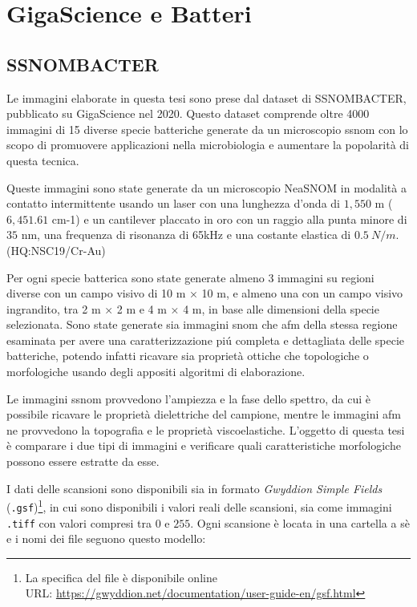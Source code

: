 \documentclass[../main.tex]{subfiles}
\begin{document}
\chapter{GigaScience e Batteri}

\section{SSNOMBACTER}

Le immagini elaborate in questa tesi sono prese dal dataset di SSNOMBACTER, pubblicato su GigaScience nel 2020. Questo dataset comprende oltre 4000 immagini di 15 diverse specie batteriche generate da un microscopio \acrshort{ssnom} con lo scopo di promuovere applicazioni nella \Gls{microbiologia} e aumentare la popolarità di questa tecnica.\cite{ssnombacter}

Queste immagini sono state generate da un microscopio NeaSNOM in modalità a contatto intermittente usando un laser con una lunghezza d'onda di $1,550$ \micro m ($6,451.61$ \gls{cm-1}) e un cantilever placcato in oro con un raggio alla punta minore di $35$ nm, una frequenza di risonanza di 65kHz e una costante elastica di $0.5\ N/m$. (HQ:NSC19/Cr-Au)\cite{micromasch}

Per ogni specie batterica sono state generate almeno 3 immagini su regioni diverse con un campo visivo di 10 \micro m × 10 \micro m, e almeno una con un campo visivo ingrandito, tra 2 \micro m × 2 \micro m e 4 \micro m × 4 \micro m, in base alle dimensioni della specie selezionata. Sono state generate sia immagini \acrshort{snom} che \acrshort{afm} della stessa regione esaminata per avere una caratterizzazione piú completa e dettagliata delle specie batteriche, potendo infatti ricavare sia proprietà ottiche che topologiche o morfologiche usando degli appositi algoritmi di elaborazione. 

Le immagini \acrshort{ssnom} provvedono l'ampiezza e la fase dello spettro, da cui è possibile ricavare le proprietà dielettriche del campione, mentre le immagini \acrshort{afm} ne provvedono la topografia e le proprietà viscoelastiche. L'oggetto di questa tesi è comparare i due tipi di immagini e verificare quali caratteristiche morfologiche possono essere estratte da esse.

I dati delle scansioni sono disponibili sia in formato \textit{Gwyddion Simple Fields}\cite{gwyddion} (\texttt{.gsf})\footnote{La specifica del file è disponibile online\\URL: \url{https://gwyddion.net/documentation/user-guide-en/gsf.html}}, in cui sono disponibili i valori reali delle scansioni, sia come immagini \texttt{.tiff} con valori compresi tra $0$ e $255$. Ogni scansione è locata in una cartella a sè e i nomi dei file seguono questo modello:
\end{document}
